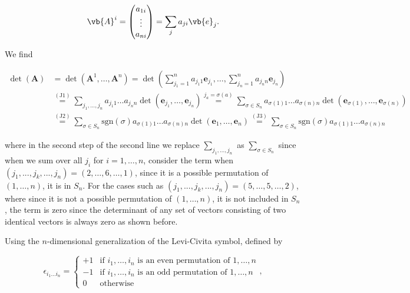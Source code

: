 \documentclass[a4paper,12pt]{report}
\begin{document}
\begin{equation}
    \vb{A} ^{i} = \begin{pmatrix}
         a_{1i}  \\
         \vdots  \\
         a_{ni} \\
    \end{pmatrix} = \sum_{j}^{} a_{ji} \vb{e} _{j}.  
\end{equation}

We find

\begin{equation} \label{detdef} 
\begin{aligned}
\det(\mathbf{A}) &= \det(\mathbf{A}^1, \ldots, \mathbf{A}^n) = \det \left( \sum_{j_1=1}^{n} a_{j_1 1} \mathbf{e}_{j_1}, \ldots, \sum_{j_n=1}^{n} a_{j_n n} \mathbf{e}_{j_n} \right) \\ &\overset{(\text{J1})}{=} \sum_{j_1, \ldots, j_n} a_{j_1 1} \ldots a_{j_n n} \det(\mathbf{e}_{j_1}, \ldots, \mathbf{e}_{j_n}) \overset{j_a = \sigma(a)}{=} \sum_{\sigma \in S_n} a_{\sigma(1) 1} \ldots a_{\sigma(n) n} \det(\mathbf{e}_{\sigma(1)}, \ldots, \mathbf{e}_{\sigma(n)}) \\ &\overset{(\text{J2})}{=} \sum_{\sigma \in S_n} \text{sgn}(\sigma) a_{\sigma(1) 1} \ldots a_{\sigma(n) n} \det(\mathbf{e}_1, \ldots, \mathbf{e}_n) \overset{(\text{J3})}{=} \sum_{\sigma \in S_n} \text{sgn}(\sigma) a_{\sigma(1) 1} \ldots a_{\sigma(n) n}
\end{aligned}
\end{equation}

where in the second step of the second line we replace \(\sum_{j_1 ,..., j_{n} }^{} \) as \(\sum_{\sigma \in S_{n} }^{} \) since when we sum over all \(j_{i}\) for \(i = 1,\ldots ,n\), consider the term when \((j_1 , ..., j_{k}, ..., j_{n}) = (2,\ldots ,6,\ldots ,1)\), since it is a possible permutation of \((1,\ldots ,n)\), it is in \(S_{n} \). For the cases such as \((j_1 , ..., j_{k}, ..., j_{n}) = (5,\ldots ,5,\ldots ,2)\), where since it is not a possible permutation of \((1,\ldots ,n)\), it is not included in \(S_{n} \), the term is zero since the determinant of any set of vectors consisting of two identical vectors is always zero as shown before.



Using the \(n\)-dimensional generalization of the Levi-Civita symbol, defined by 

\begin{equation}
    \epsilon_{i_1 \ldots  i_n} = 
    \begin{cases} 
    +1 & \text{if } i_1, \ldots, i_n \text{ is an even permutation of } 1, \ldots, n \\ 
    -1 & \text{if } i_1, \ldots, i_n \text{ is an odd permutation of } 1, \ldots, n \\ 
    0 & \text{otherwise} 
    \end{cases},
\end{equation}
    
\end{document}
